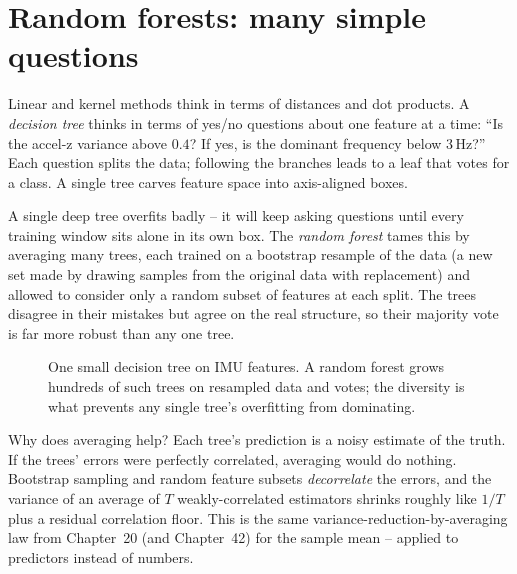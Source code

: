 \section{Random forests: many simple questions}
\label{ch39:forests}

Linear and kernel methods think in terms of distances and dot products. A \emph{decision
tree} thinks in terms of yes/no questions about one feature at a time: ``Is the accel-z
variance above $0.4$? If yes, is the dominant frequency below $3$\,Hz?'' Each question
splits the data; following the branches leads to a leaf that votes for a class. A single
tree carves feature space into axis-aligned boxes.

A single deep tree overfits badly -- it will keep asking questions until every training
window sits alone in its own box. The \emph{random forest} tames this by averaging many
trees, each trained on a bootstrap resample of the data (a new set made by drawing samples from the original data with replacement) and allowed to consider only a
random subset of features at each split. The trees disagree in their mistakes but agree
on the real structure, so their majority vote is far more robust than any one tree.

\begin{figure}[H]
\centering
{}
\caption{One small decision tree on IMU features. A random forest grows hundreds of
such trees on resampled data and votes; the diversity is what prevents any single tree's
overfitting from dominating.}
\label{ch39:fig-tree}
\end{figure}

\begin{whybox}
Why does averaging help? Each tree's prediction is a noisy estimate of the truth. If the
trees' errors were perfectly correlated, averaging would do nothing. Bootstrap sampling and random feature subsets \emph{decorrelate} the errors, and the variance of an average
of $T$ weakly-correlated estimators shrinks roughly like $1/T$ plus a residual
correlation floor. This is the same variance-reduction-by-averaging law from Chapter~20 (and Chapter~42) for the sample mean -- applied to predictors instead of numbers.
\end{whybox}

